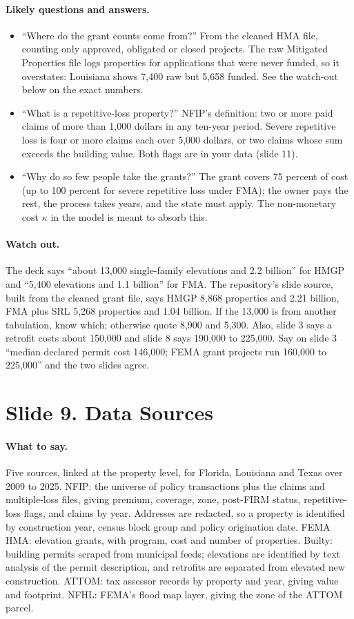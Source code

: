 \documentclass[11pt]{article}
\newcommand{\slide}[2]{\section*{Slide #1. #2}\addcontentsline{toc}{section}{Slide #1. #2}}
\newcommand{\say}{\paragraph{What to say.}}
\newcommand{\qa}{\paragraph{Likely questions and answers.}}
\newcommand{\watch}{\paragraph{Watch out.}}
\begin{document}
\qa
\begin{itemize}
\item ``Where do the grant counts come from?'' From the cleaned HMA file, counting only approved, obligated or closed projects. The raw Mitigated Properties file logs properties for applications that were never funded, so it overstates: Louisiana shows 7,400 raw but 5,658 funded. See the watch-out below on the exact numbers.
\item ``What is a repetitive-loss property?'' NFIP's definition: two or more paid claims of more than 1,000 dollars in any ten-year period. Severe repetitive loss is four or more claims each over 5,000 dollars, or two claims whose sum exceeds the building value. Both flags are in your data (slide 11).
\item ``Why do so few people take the grants?'' The grant covers 75 percent of cost (up to 100 percent for severe repetitive loss under FMA); the owner pays the rest, the process takes years, and the state must apply. The non-monetary cost $\kappa$ in the model is meant to absorb this.
\end{itemize}

\watch The deck says ``about 13,000 single-family elevations and 2.2 billion'' for HMGP and ``5,400 elevations and 1.1 billion'' for FMA. The repository's slide source, built from the cleaned grant file, says HMGP 8,868 properties and 2.21 billion, FMA plus SRL 5,268 properties and 1.04 billion. If the 13,000 is from another tabulation, know which; otherwise quote 8,900 and 5,300. Also, slide 3 says a retrofit costs about 150,000 and slide 8 says 190,000 to 225,000. Say on slide 3 ``median declared permit cost 146,000; FEMA grant projects run 160,000 to 225,000'' and the two slides agree.

\slide{9}{Data Sources}
\say Five sources, linked at the property level, for Florida, Louisiana and Texas over 2009 to 2025. NFIP: the universe of policy transactions plus the claims and multiple-loss files, giving premium, coverage, zone, post-FIRM status, repetitive-loss flags, and claims by year. Addresses are redacted, so a property is identified by construction year, census block group and policy origination date. FEMA HMA: elevation grants, with program, cost and number of properties. Builty: building permits scraped from municipal feeds; elevations are identified by text analysis of the permit description, and retrofits are separated from elevated new construction. ATTOM: tax assessor records by property and year, giving value and footprint. NFHL: FEMA's flood map layer, giving the zone of the ATTOM parcel.
\end{document}
